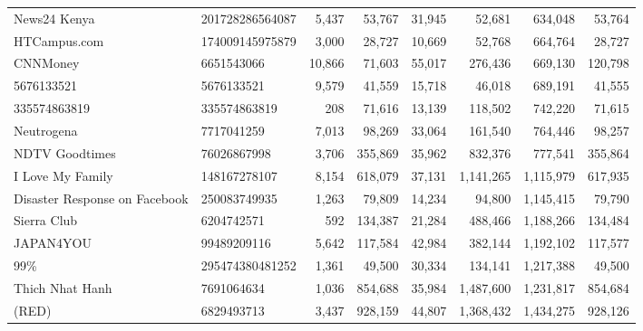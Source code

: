 \begin{longtable}{llrrrrrr}
                                      News24 Kenya &  201728286564087 &   5,437 &      53,767 &     31,945 &      52,681 &     634,048 &    53,764 \\
                                      HTCampus.com &  174009145975879 &   3,000 &      28,727 &     10,669 &      52,768 &     664,764 &    28,727 \\
                                          CNNMoney &       6651543066 &  10,866 &      71,603 &     55,017 &     276,436 &     669,130 &   120,798 \\
                                        5676133521 &       5676133521 &   9,579 &      41,559 &     15,718 &      46,018 &     689,191 &    41,555 \\
                                      335574863819 &     335574863819 &     208 &      71,616 &     13,139 &     118,502 &     742,220 &    71,615 \\
                                        Neutrogena &       7717041259 &   7,013 &      98,269 &     33,064 &     161,540 &     764,446 &    98,257 \\
                                    NDTV Goodtimes &      76026867998 &   3,706 &     355,869 &     35,962 &     832,376 &     777,541 &   355,864 \\
                                  I Love My Family &     148167278107 &   8,154 &     618,079 &     37,131 &   1,141,265 &   1,115,979 &   617,935 \\
                     Disaster Response on Facebook &     250083749935 &   1,263 &      79,809 &     14,234 &      94,800 &   1,145,415 &    79,790 \\
                                       Sierra Club &       6204742571 &     592 &     134,387 &     21,284 &     488,466 &   1,188,266 &   134,484 \\
                                         JAPAN4YOU &      99489209116 &   5,642 &     117,584 &     42,984 &     382,144 &   1,192,102 &   117,577 \\
                                              99\% &  295474380481252 &   1,361 &      49,500 &     30,334 &     134,141 &   1,217,388 &    49,500 \\
                                   Thich Nhat Hanh &       7691064634 &   1,036 &     854,688 &     35,984 &   1,487,600 &   1,231,817 &   854,684 \\
                                             (RED) &       6829493713 &   3,437 &     928,159 &     44,807 &   1,368,432 &   1,434,275 &   928,126 \\

\end{longtable}
